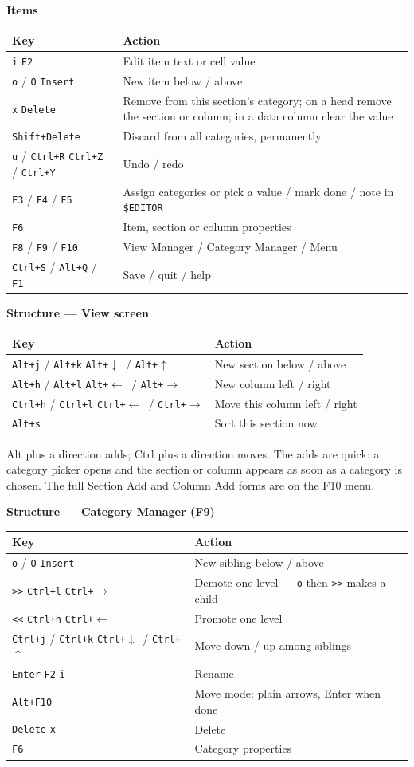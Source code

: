 \documentclass[10pt]{article}
\newcommand{\key}[1]{\texttt{#1}}
\newcommand{\up}{$\uparrow$}
\newcommand{\dn}{$\downarrow$}
\newcommand{\lft}{$\leftarrow$}
\newcommand{\rgt}{$\rightarrow$}
\newcommand{\sep}{\hspace{0.7em}}
\newcommand{\heading}[1]{\par\vspace{5pt}\textbf{#1}\par\vspace{3pt}}
\newenvironment{keytable}[1]
  {\begin{tabular}{|>{\raggedright\arraybackslash}p{5.4cm}|>{\raggedright\arraybackslash}p{#1}|}\hline
   \textbf{Key} & \textbf{Action}\\\hline\hline}
  {\end{tabular}}
\begin{document}
\heading{Items}
\begin{keytable}{12.6cm}
\key{i} \sep \key{F2} & Edit item text or cell value\\\hline
\key{o} / \key{O} \sep \key{Insert} & New item below / above\\\hline
\key{x} \sep \key{Delete} & Remove from this section's category; on a head remove the section or column; in a data column clear the value\\\hline
\key{Shift+Delete} & Discard from all categories, permanently\\\hline
\key{u} / \key{Ctrl+R} \sep \key{Ctrl+Z} / \key{Ctrl+Y} & Undo / redo\\\hline
\key{F3} / \key{F4} / \key{F5} & Assign categories or pick a value / mark done / note in \texttt{\$EDITOR}\\\hline
\key{F6} & Item, section or column properties\\\hline
\key{F8} / \key{F9} / \key{F10} & View Manager / Category Manager / Menu\\\hline
\key{Ctrl+S} / \key{Alt+Q} / \key{F1} & Save / quit / help\\\hline
\end{keytable}

\heading{Structure --- View screen}
\begin{keytable}{12.6cm}
\key{Alt+j} / \key{Alt+k} \sep \key{Alt+}\dn\ / \key{Alt+}\up & New section below / above\\\hline
\key{Alt+h} / \key{Alt+l} \sep \key{Alt+}\lft\ / \key{Alt+}\rgt & New column left / right\\\hline
\key{Ctrl+h} / \key{Ctrl+l} \sep \key{Ctrl+}\lft\ / \key{Ctrl+}\rgt & Move this column left / right\\\hline
\key{Alt+s} & Sort this section now\\\hline
\end{keytable}

Alt plus a direction adds; Ctrl plus a direction moves. The adds are quick: a
category picker opens and the section or column appears as soon as a category
is chosen. The full Section Add and Column Add forms are on the F10 menu.

\heading{Structure --- Category Manager (F9)}
\begin{keytable}{12.6cm}
\key{o} / \key{O} \sep \key{Insert} & New sibling below / above\\\hline
\key{>{}>} \sep \key{Ctrl+l} \sep \key{Ctrl+}\rgt & Demote one level --- \key{o} then \key{>{}>} makes a child\\\hline
\key{<{}<} \sep \key{Ctrl+h} \sep \key{Ctrl+}\lft & Promote one level\\\hline
\key{Ctrl+j} / \key{Ctrl+k} \sep \key{Ctrl+}\dn\ / \key{Ctrl+}\up & Move down / up among siblings\\\hline
\key{Enter} \sep \key{F2} \sep \key{i} & Rename\\\hline
\key{Alt+F10} & Move mode: plain arrows, Enter when done\\\hline
\key{Delete} \sep \key{x} & Delete\\\hline
\key{F6} & Category properties\\\hline
\end{keytable}
\end{document}
